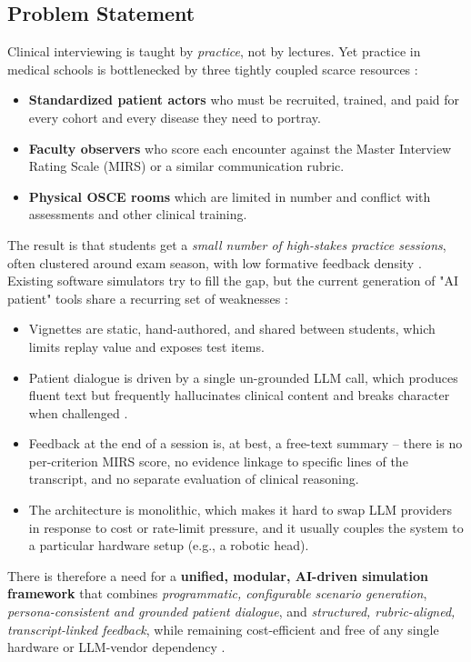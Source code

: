 \documentclass{article}
\begin{document}
\subsection{Problem Statement}

Clinical interviewing is taught by \emph{practice}, not by lectures. Yet practice in medical schools is bottlenecked by three tightly coupled scarce resources \cite{Portovaras2024CurrentTA}:
\begin{itemize}
    \item \textbf{Standardized patient actors} who must be recruited, trained, and paid for every cohort and every disease they need to portray.
    \item \textbf{Faculty observers} who score each encounter against the Master Interview Rating Scale (MIRS) or a similar communication rubric.
    \item \textbf{Physical OSCE rooms} which are limited in number and conflict with assessments and other clinical training.
\end{itemize}

The result is that students get a \emph{small number of high-stakes practice sessions}, often clustered around exam season, with low formative feedback density \cite{Plale2013BigDO}. Existing software simulators try to fill the gap, but the current generation of "AI patient" tools share a recurring set of weaknesses \cite{Azzara2023PeranPP}:

\begin{itemize}
    \item Vignettes are static, hand-authored, and shared between students, which limits replay value and exposes test items.
    \item Patient dialogue is driven by a single un-grounded LLM call, which produces fluent text but frequently hallucinates clinical content and breaks character when challenged \cite{Zhang2023SentimentAI}.
    \item Feedback at the end of a session is, at best, a free-text summary -- there is no per-criterion MIRS score, no evidence linkage to specific lines of the transcript, and no separate evaluation of clinical reasoning.
    \item The architecture is monolithic, which makes it hard to swap LLM providers in response to cost or rate-limit pressure, and it usually couples the system to a particular hardware setup (e.g., a robotic head).
\end{itemize}

There is therefore a need for a \textbf{unified, modular, AI-driven simulation framework} that combines \emph{programmatic, configurable scenario generation}, \emph{persona-consistent and grounded patient dialogue}, and \emph{structured, rubric-aligned, transcript-linked feedback}, while remaining cost-efficient and free of any single hardware or LLM-vendor dependency \cite{Kulkarni2023TheEO,Jing2024WhenLL}.
\end{document}
